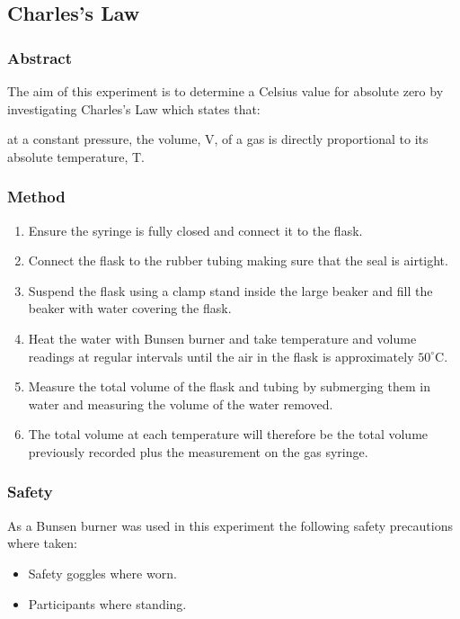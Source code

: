 \subsection{Charles's Law}

\subsubsection{Abstract}
The aim of this experiment is to determine a Celsius value for absolute zero by investigating Charles's Law which states that:
\begin{quoting}
  at a constant pressure, the volume, V, of a gas is directly proportional to its absolute temperature, T.
\end{quoting}

\subsubsection{Method}
\begin{enumerate}
  \item Ensure the syringe is fully closed and connect it to the flask.
  \item Connect the flask to the rubber tubing making sure that the seal is airtight.
  \item Suspend the flask using a clamp stand inside the large beaker and fill the beaker with water covering the flask.
  \item Heat the water with Bunsen burner and take temperature and volume readings at regular intervals until the air in the flask is approximately $50^\circ$C.
  \item Measure the total volume of the flask and tubing by submerging them in water and measuring the volume of the water removed.
  \item The total volume at each temperature will therefore be the total volume previously recorded plus the measurement on the gas syringe.
\end{enumerate}

\subsubsection{Safety}
As a Bunsen burner was used in this experiment the following safety precautions where taken:
\begin{itemize}
  \item Safety goggles where worn.
  \item Participants where standing.
\end{itemize}

